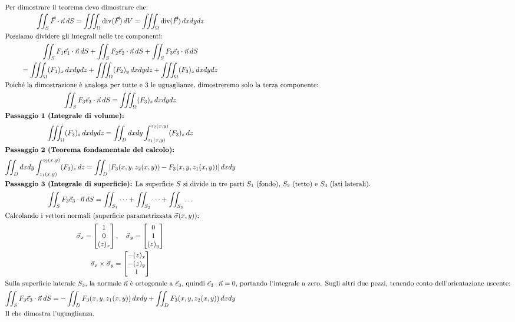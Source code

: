 \begin{gather}
\intertext{Per dimostrare il teorema devo dimostrare che:}
\iint_{S} \vec{F} \cdot \vec{n} \, dS = \iiint_{\Omega} \text{div}(\vec{F}) \, dV = \iiint_{\Omega} \text{div}(\vec{F}) \, dx dy dz \\
\intertext{Possiamo dividere gli integrali nelle tre componenti:}
\iint_{S} F_1 \vec{e}_1 \cdot \vec{n} \, dS + \iint_{S} F_2 \vec{e}_2 \cdot \vec{n} \, dS + \iint_{S} F_3 \vec{e}_3 \cdot \vec{n} \, dS \notag \\
= \iiint_{\Omega} (F_1)_x \, dx dy dz + \iiint_{\Omega} (F_2)_y \, dx dy dz + \iiint_{\Omega} (F_3)_z \, dx dy dz \\
\intertext{Poiché la dimostrazione è analoga per tutte e 3 le uguaglianze, dimostreremo solo la terza componente:}
\iint_{S} F_3 \vec{e}_3 \cdot \vec{n} \, dS = \iiint_{\Omega} (F_3)_z \, dx dy dz \\
\intertext{\textbf{Passaggio 1 (Integrale di volume):}}
\iiint_{\Omega} (F_3)_z \, dx dy dz = \iint_{D} dx dy \int_{z_1(x,y)}^{z_2(x,y)} (F_3)_z \, dz \\
\intertext{\textbf{Passaggio 2 (Teorema fondamentale del calcolo):}}
\iint_{D} dx dy \int_{z_1(x,y)}^{z_2(x,y)} (F_3)_z \, dz = \iint_{D} \left[ F_3(x,y,z_2(x,y)) - F_3(x,y,z_1(x,y)) \right] dx dy \\
\intertext{\textbf{Passaggio 3 (Integrale di superficie):} La superficie $S$ si divide in tre parti $S_1$ (fondo), $S_2$ (tetto) e $S_3$ (lati laterali).}
\iint_{S} F_3 \vec{e}_3 \cdot \vec{n} \, dS = \iint_{S_1} \dots + \iint_{S_2} \dots + \iint_{S_3} \dots \\
\intertext{Calcolando i vettori normali (superficie parametrizzata $\vec{\sigma}(x,y)$):}
\vec{\sigma}_x = \begin{bmatrix} 1 \\ 0 \\ (z)_x \end{bmatrix}, \quad \vec{\sigma}_y = \begin{bmatrix} 0 \\ 1 \\ (z)_y \end{bmatrix} \\
\vec{\sigma}_x \times \vec{\sigma}_y = \begin{bmatrix} -(z)_x \\ -(z)_y \\ 1 \end{bmatrix} \\
\intertext{Sulla superficie laterale $S_3$, la normale $\vec{n}$ è ortogonale a $\vec{e}_3$, quindi $\vec{e}_3 \cdot \vec{n} = 0$, portando l'integrale a zero. Sugli altri due pezzi, tenendo conto dell'orientazione uscente:}
\iint_{S} F_3 \vec{e}_3 \cdot \vec{n} \, dS = -\iint_{D} F_3(x,y,z_1(x,y)) \, dx dy + \iint_{D} F_3(x,y,z_2(x,y)) \, dx dy \\
\intertext{Il che dimostra l'uguaglianza.}
\end{gather}